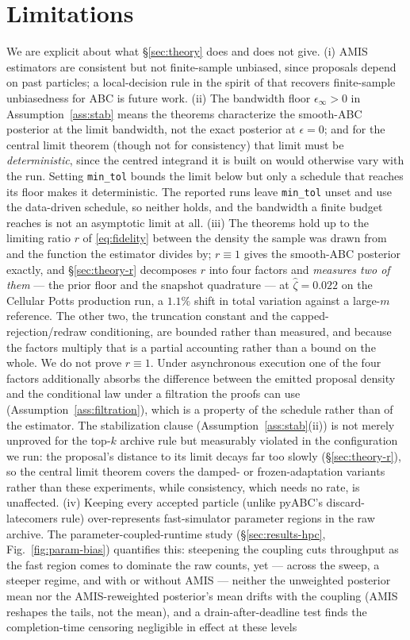\section{Limitations}\label{sec:limitations}
We are explicit about what \S\ref{sec:theory} does and does not give. (i) AMIS estimators are consistent but not finite-sample unbiased, since proposals depend on past particles; a local-decision rule in the spirit of \cite{paige2014cascade} that recovers finite-sample unbiasedness for ABC is future work. (ii) The bandwidth floor $\epsilon_\infty>0$ in Assumption~\ref{ass:stab} means the theorems characterize the smooth-ABC posterior at the limit bandwidth, not the exact posterior at $\epsilon=0$; and for the central limit theorem (though not for consistency) that limit must be \emph{deterministic}, since the centred integrand it is built on would otherwise vary with the run. Setting \texttt{min\_tol} bounds the limit below but only a schedule that reaches its floor makes it deterministic. The reported runs leave \texttt{min\_tol} unset and use the data-driven schedule, so neither holds, and the bandwidth a finite budget reaches is not an asymptotic limit at all. (iii) The theorems hold up to the limiting ratio $r$ of \eqref{eq:fidelity} between the density the sample was drawn from and the function the estimator divides by; $r\equiv1$ gives the smooth-ABC posterior exactly, and \S\ref{sec:theory-r} decomposes $r$ into four factors and \emph{measures two of them} --- the prior floor and the snapshot quadrature --- at $\widehat\zeta=0.022$ on the Cellular Potts production run, a $1.1\%$ shift in total variation against a large-$m$ reference. The other two, the truncation constant and the capped-rejection/redraw conditioning, are bounded rather than measured, and because the factors multiply that is a partial accounting rather than a bound on the whole. We do not prove $r\equiv1$. Under asynchronous execution one of the four factors additionally absorbs the difference between the emitted proposal density and the conditional law under a filtration the proofs can use (Assumption~\ref{ass:filtration}), which is a property of the schedule rather than of the estimator. The stabilization clause (Assumption~\ref{ass:stab}(ii)) is not merely unproved for the top-$k$ archive rule but measurably violated in the configuration we run: the proposal's distance to its limit decays far too slowly (\S\ref{sec:theory-r}), so the central limit theorem covers the damped- or frozen-adaptation variants rather than these experiments, while consistency, which needs no rate, is unaffected. (iv) Keeping every accepted particle (unlike pyABC's discard-latecomers rule) over-represents fast-simulator parameter regions in the raw archive. The parameter-coupled-runtime study (\S\ref{sec:results-hpc}, Fig.~\ref{fig:param-bias}) quantifies this: steepening the coupling cuts throughput as the fast region comes to dominate the raw counts, yet --- across the sweep, a steeper regime, and with or without AMIS --- neither the unweighted posterior mean nor the AMIS-reweighted posterior's mean drifts with the coupling (AMIS reshapes the tails, not the mean), and a drain-after-deadline test finds the completion-time censoring negligible in effect at these levels 